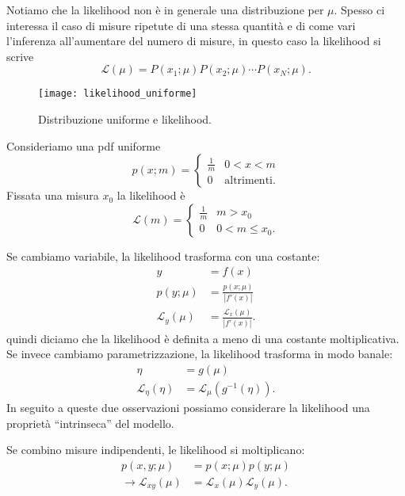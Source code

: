 Notiamo che la likelihood non è in generale una distribuzione per $\mu$.
Spesso ci interessa il caso di misure ripetute di una stessa quantità e di come vari l'inferenza all'aumentare del numero di misure, in questo caso la likelihood si scrive
\begin{equation*}
	\mathcal L(\mu) = P(x_1;\mu) P(x_2;\mu) \dotsm P(x_N;\mu).
\end{equation*}

\begin{example}
	\begin{figure}
		\centering
		\texttt{[image: likelihood\_uniforme]}
		\caption{Distribuzione uniforme e likelihood.}
	\end{figure}
	Consideriamo una pdf uniforme
	\begin{equation*}
		p(x;m) = \begin{cases}
			\frac 1m & 0<x<m \\
			0 & \text{altrimenti.}
		\end{cases}
	\end{equation*}
	Fissata una misura $x_0$ la likelihood è
	\begin{equation*}
		\mathcal L(m) = \begin{cases}
			\frac 1m & m > x_0 \\
			0 & 0 < m \le x_0.
		\end{cases}
	\end{equation*}
\end{example}

Se cambiamo variabile, la likelihood trasforma con una costante:
\begin{align*}
	y &= f(x) \\
	p(y;\mu) &= \frac{p(x;\mu)}{|f'(x)|} \\
	\mathcal L_y(\mu) &= \frac{\mathcal L_x(\mu)}{|f'(x)|}.
\end{align*}
quindi diciamo che la likelihood è definita a meno di una costante moltiplicativa.
Se invece cambiamo parametrizzazione, la likelihood trasforma in modo banale:
\begin{align*}
	\eta &= g(\mu) \\
	\mathcal L_\eta(\eta) &= \mathcal L_\mu(g^{-1}(\eta)).
\end{align*}
In seguito a queste due osservazioni possiamo considerare la likelihood una proprietà ``intrinseca'' del modello.

Se combino misure indipendenti, le likelihood si moltiplicano:
\begin{align*}
	p(x,y;\mu) &= p(x;\mu) p(y;\mu) \\
	\rightarrow \mathcal L_{xy}(\mu) &= \mathcal L_x(\mu) \mathcal L_y(\mu).
\end{align*}


